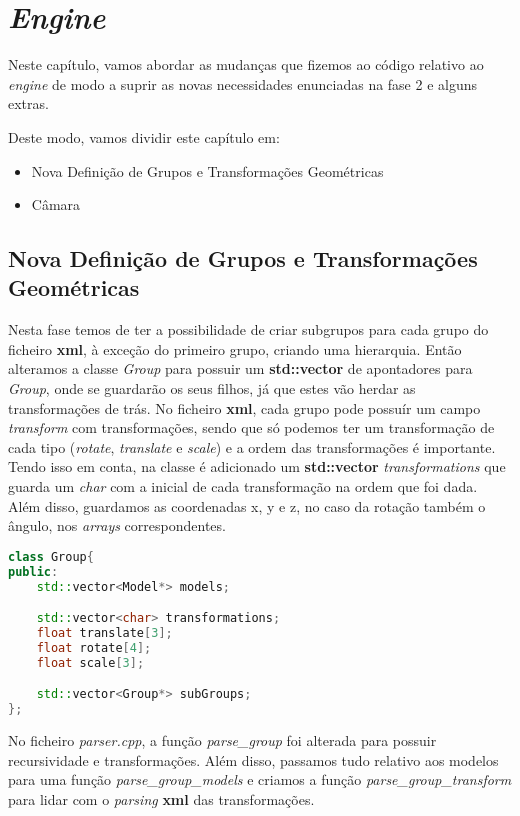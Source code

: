 \documentclass[14pt, a4 paper]{report}
\begin{document}
\chapter{\textit{Engine}} \label{chap:engine}

Neste capítulo, vamos abordar as mudanças que fizemos ao código relativo ao \textit{engine} de modo a suprir as novas necessidades enunciadas na fase 2 e alguns extras.

Deste modo, vamos dividir este capítulo em:
\begin{itemize}
    \item Nova Definição de Grupos e Transformações Geométricas
    \item Câmara
\end{itemize}

\section{Nova Definição de Grupos e Transformações Geométricas}
Nesta fase temos de ter a possibilidade de criar subgrupos para cada grupo do ficheiro \textbf{xml}, à exceção do primeiro grupo, criando uma hierarquia. Então alteramos a classe \textit{Group} para possuir um \textbf{std::vector} de apontadores para \textit{Group}, onde se guardarão os seus filhos, já que estes vão herdar as transformações de trás. No ficheiro \textbf{xml}, cada grupo pode possuír um campo \textit{transform} com transformações, sendo que só podemos ter um transformação de cada tipo (\textit{rotate}, \textit{translate} e \textit{scale}) e a ordem das transformações é importante. Tendo isso em conta, na classe é adicionado um \textbf{std::vector} \textit{transformations} que guarda um \textit{char} com a inicial de cada transformação na ordem que foi dada. Além disso, guardamos as coordenadas x, y e z, no caso da rotação também o ângulo, nos \textit{arrays} correspondentes.

\begin{lstlisting}[language = c++]
class Group{
public:
    std::vector<Model*> models;

    std::vector<char> transformations;
    float translate[3];
    float rotate[4];
    float scale[3];

    std::vector<Group*> subGroups;
};
\end{lstlisting}

No ficheiro \textit{parser.cpp}, a função \textit{parse\_group} foi alterada para possuir recursividade e transformações. Além disso, passamos tudo relativo aos modelos para uma função \textit{parse\_group\_models} e criamos a função \textit{parse\_group\_transform} para lidar com o \textit{parsing} \textbf{xml} das transformações.
\end{document}
